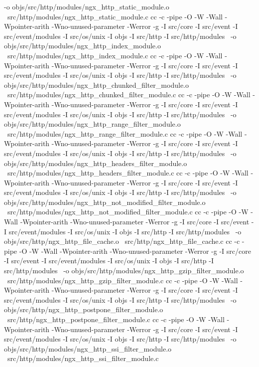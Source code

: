 	-o objs/src/http/modules/ngx_http_static_module.o \
	src/http/modules/ngx_http_static_module.c
cc -c -pipe  -O -W -Wall -Wpointer-arith -Wno-unused-parameter -Werror -g  -I src/core -I src/event -I src/event/modules -I src/os/unix -I objs -I src/http -I src/http/modules \
	-o objs/src/http/modules/ngx_http_index_module.o \
	src/http/modules/ngx_http_index_module.c
cc -c -pipe  -O -W -Wall -Wpointer-arith -Wno-unused-parameter -Werror -g  -I src/core -I src/event -I src/event/modules -I src/os/unix -I objs -I src/http -I src/http/modules \
	-o objs/src/http/modules/ngx_http_chunked_filter_module.o \
	src/http/modules/ngx_http_chunked_filter_module.c
cc -c -pipe  -O -W -Wall -Wpointer-arith -Wno-unused-parameter -Werror -g  -I src/core -I src/event -I src/event/modules -I src/os/unix -I objs -I src/http -I src/http/modules \
	-o objs/src/http/modules/ngx_http_range_filter_module.o \
	src/http/modules/ngx_http_range_filter_module.c
cc -c -pipe  -O -W -Wall -Wpointer-arith -Wno-unused-parameter -Werror -g  -I src/core -I src/event -I src/event/modules -I src/os/unix -I objs -I src/http -I src/http/modules \
	-o objs/src/http/modules/ngx_http_headers_filter_module.o \
	src/http/modules/ngx_http_headers_filter_module.c
cc -c -pipe  -O -W -Wall -Wpointer-arith -Wno-unused-parameter -Werror -g  -I src/core -I src/event -I src/event/modules -I src/os/unix -I objs -I src/http -I src/http/modules \
	-o objs/src/http/modules/ngx_http_not_modified_filter_module.o \
	src/http/modules/ngx_http_not_modified_filter_module.c
cc -c -pipe  -O -W -Wall -Wpointer-arith -Wno-unused-parameter -Werror -g  -I src/core -I src/event -I src/event/modules -I src/os/unix -I objs -I src/http -I src/http/modules \
	-o objs/src/http/ngx_http_file_cache.o \
	src/http/ngx_http_file_cache.c
cc -c -pipe  -O -W -Wall -Wpointer-arith -Wno-unused-parameter -Werror -g  -I src/core -I src/event -I src/event/modules -I src/os/unix -I objs -I src/http -I src/http/modules \
	-o objs/src/http/modules/ngx_http_gzip_filter_module.o \
	src/http/modules/ngx_http_gzip_filter_module.c
cc -c -pipe  -O -W -Wall -Wpointer-arith -Wno-unused-parameter -Werror -g  -I src/core -I src/event -I src/event/modules -I src/os/unix -I objs -I src/http -I src/http/modules \
	-o objs/src/http/ngx_http_postpone_filter_module.o \
	src/http/ngx_http_postpone_filter_module.c
cc -c -pipe  -O -W -Wall -Wpointer-arith -Wno-unused-parameter -Werror -g  -I src/core -I src/event -I src/event/modules -I src/os/unix -I objs -I src/http -I src/http/modules \
	-o objs/src/http/modules/ngx_http_ssi_filter_module.o \
	src/http/modules/ngx_http_ssi_filter_module.c
